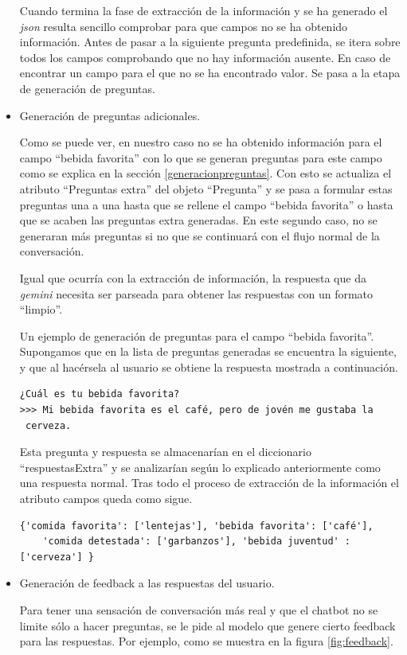 \begin{itemize}
	 Cuando termina la fase de extracción de la información y se ha generado el \textit{json} resulta sencillo comprobar para que campos no se ha obtenido información. Antes de pasar a la siguiente pregunta predefinida, se itera sobre todos los campos comprobando que no hay información ausente. En caso de encontrar un campo para el que no se ha encontrado valor. Se pasa a la etapa de generación de preguntas. 
	
	\item Generación de preguntas adicionales.
	
	 Como se puede ver, en nuestro caso no se ha obtenido información para el campo ``bebida favorita'' con lo que se generan preguntas para este campo como se explica en la sección \ref{generacionpreguntas}. Con esto se actualiza el atributo ``Preguntas extra'' del objeto ``Pregunta'' y se pasa a formular estas preguntas una a una hasta que se rellene el campo ``bebida favorita'' o hasta que se acaben las preguntas extra generadas. En este segundo caso, no se generaran más preguntas si no que se continuará con el flujo normal de la conversación. 
	
	Igual que ocurría con la extracción de información, la respuesta que da \textit{gemini} necesita ser parseada para obtener las respuestas con un formato ``limpio''.
	
	Un ejemplo de generación de preguntas para el campo ``bebida favorita''. Supongamos que en la lista de preguntas generadas se encuentra la siguiente, y que al hacérsela al usuario se obtiene la respuesta mostrada a continuación. 
	
\begin{verbatim}
¿Cuál es tu bebida favorita? 
>>> Mi bebida favorita es el café, pero de jovén me gustaba la
 cerveza.

\end{verbatim}

Esta pregunta y respuesta se almacenarían en el diccionario ``respuestasExtra'' y se analizarían según lo explicado anteriormente como una respuesta normal. Tras todo el proceso de extracción de la información el atributo campos queda como sigue. 

\begin{verbatim}
{'comida favorita': ['lentejas'], 'bebida favorita': ['café'], 
	'comida detestada': ['garbanzos'], 'bebida juventud' : ['cerveza'] }

\end{verbatim}
	 \item Generación de feedback a las respuestas del usuario.
	 
	  Para tener una sensación de conversación más real y que el chatbot no se limite sólo a hacer preguntas, se le pide al modelo que genere cierto feedback para las respuestas. Por ejemplo, como se muestra en la figura \ref{fig:feedback}.
\end{itemize}

